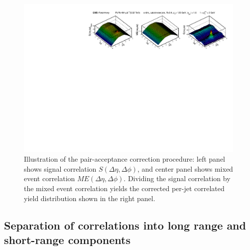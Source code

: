 \begin{figure}[ht!] 
\begin{center} 
\includegraphics[width=0.99\textwidth]{figures/Results/ME_Correction.pdf}
\caption[Illustration of the pair-acceptance correction procedure]{Illustration of the pair-acceptance correction procedure:  left panel shows signal correlation $S(\Delta\eta,\Delta\phi)$, and center panel shows mixed event correlation $ME(\Delta\eta,\Delta\phi)$.  Dividing the signal correlation by the mixed event correlation yields the corrected per-jet correlated yield distribution shown in the right panel.}
\label{fig:ME_corr}
\end{center} 
\end{figure} 

  
\subsection{Separation of correlations into long range and short-range components}
\label{sec:bkg_sub}

